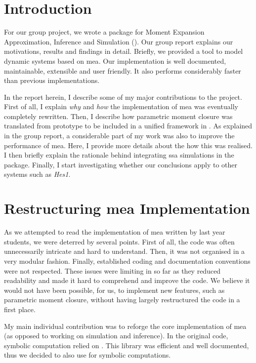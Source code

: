 \newpage{}

\section{Introduction}

For our group project, we wrote a \py{} package for Moment Expansion Approximation, Inference and Simulation (\means).
Our group report explains our motivations, results and findings in detail.
Briefly, we provided a tool to model dynamic systems based on \acrlong{mea}\cite{ale_general_2013}.
Our implementation is well documented, maintainable, extensible and user friendly.
It also performs considerably faster than previous implementations.

In the report herein, I describe some of my major contributions to the project.
First of all, I explain \emph{why} and \emph{how} the implementation of \acrlong{mea} was eventually completely rewritten.
Then, I describe how parametric moment closure was translated from \mat{} prototype to be included in a unified framework in \means.
As explained in the group report, a considerable part of my work was also to improve the performance of \gls{mea}.
Here, I provide more details about the how this was realised.  
I then briefly explain the rationale behind integrating \acrlong{ssa} simulations in the package.
Finally, I start investigating whether our conclusions apply to other systems such as \emph{Hes1}.

\section{Restructuring \acrlong{mea} Implementation}
As we attempted to read the \py{} implementation of \acrshort{mea} written by last year students\cite{babtie_moment_2013},
we were deterred by several points.
First of all, the code was often unnecessarily intricate and hard to understand.
Then, it was not organised in a very modular fashion.
Finally, established \py{} coding and documentation conventions\cite{_pep_????} were not respected.
These issues were limiting in so far as they reduced readability and made it hard to comprehend and improve the code.
We believe it would not have been possible, for us, to implement new features, such as parametric moment closure,
without having largely restructured the code in a first place.

My main individual contribution was to reforge the core implementation of \acrshort{mea} (as opposed to working on simulation and inference).
In the original code, symbolic computation relied on \sympy{}\cite{sympy_development_team_sympy:_2014}.
This library was efficient and well documented, thus we decided to also use \sympy{} for symbolic computations.
 
